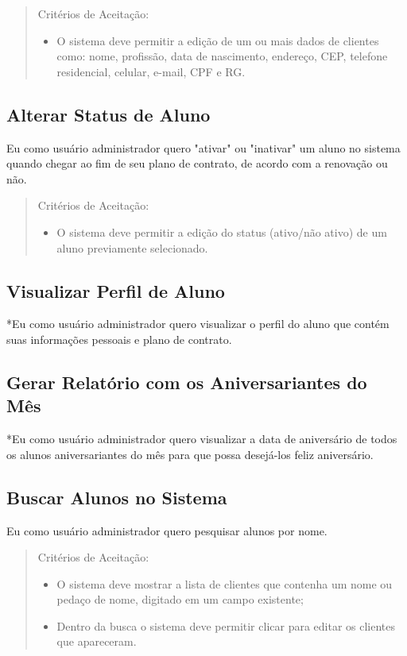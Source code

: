 \begin{quote}
Critérios de Aceitação:
    \begin{itemize}
        \item O sistema deve permitir a edição de um ou mais dados de clientes como: nome,
        profissão, data de nascimento, endereço, CEP, telefone residencial, celular,
        e-mail, CPF e RG.
    \end{itemize}
\end{quote}

\subsection[Alterar Status de Aluno]{Alterar Status de Aluno}
Eu como usuário administrador quero "ativar" ou "inativar" um aluno no sistema
quando chegar ao fim de seu plano de contrato, de acordo com a renovação ou não.

\begin{quote}
Critérios de Aceitação:
    \begin{itemize}
        \item O sistema deve permitir a edição do status (ativo/não ativo) de um aluno
        previamente selecionado.
    \end{itemize}
\end{quote}

\subsection[Visualizar Perfil de Aluno]{Visualizar Perfil de Aluno}
*Eu como usuário administrador quero visualizar o perfil do aluno que contém suas
informações pessoais e plano de contrato.

\subsection[Gerar Relatório com os Aniversariantes do Mês]{Gerar Relatório com os Aniversariantes do Mês}
*Eu como usuário administrador quero visualizar a data de aniversário de todos os
alunos aniversariantes do mês para que possa desejá-los feliz aniversário.

\subsection[Buscar Alunos no Sistema]{Buscar Alunos no Sistema}
Eu como usuário administrador quero pesquisar alunos por nome.

\begin{quote}
Critérios de Aceitação:
    \begin{itemize}
        \item O sistema deve mostrar a lista de clientes que contenha um nome ou pedaço de
        nome, digitado em um campo existente;
        \item Dentro da busca o sistema deve permitir clicar para editar os clientes que
        apareceram.
    \end{itemize}
\end{quote}
